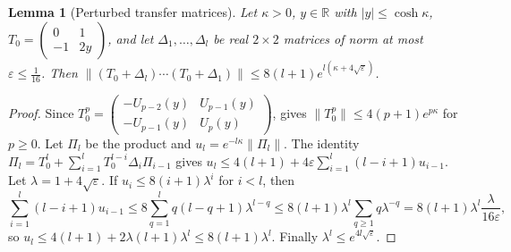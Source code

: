 \documentclass[11pt]{amsart}
\newtheorem{lemma}[theorem]{Lemma}
\theoremstyle{definition}
\theoremstyle{remark}
\numberwithin{equation}{section}
\newcommand{\R}{\mathbb{R}}
\newcommand{\eps}{\varepsilon}
\begin{document}
\begin{lemma}[Perturbed transfer matrices]\label{lem:perturbed}
Let $\kappa>0$, $y\in\R$ with $|y|\le\cosh\kappa$, $T_0=\begin{pmatrix}0&1\\-1&2y\end{pmatrix}$, and let $\Delta_1,\dots,\Delta_l$ be real $2\times2$ matrices of norm at most $\eps\le\frac1{16}$. Then $\|(T_0+\Delta_l)\cdots(T_0+\Delta_1)\|\le8(l+1)e^{l(\kappa+4\sqrt\eps)}$.
\end{lemma}

\begin{proof}
Since $T_0^p=\begin{pmatrix}-U_{p-2}(y)&U_{p-1}(y)\\-U_{p-1}(y)&U_p(y)\end{pmatrix}$, \cite[Lemma~\ref{M-lem:chebyshev}]{Main} gives $\|T_0^p\|\le4(p+1)e^{p\kappa}$ for $p\ge0$. Let $\Pi_l$ be the product and $u_l=e^{-l\kappa}\|\Pi_l\|$. The identity $\Pi_l=T_0^l+\sum_{i=1}^lT_0^{l-i}\Delta_i\Pi_{i-1}$ gives $u_l\le4(l+1)+4\eps\sum_{i=1}^l(l-i+1)u_{i-1}$. Let $\lambda=1+4\sqrt\eps$. If $u_i\le8(i+1)\lambda^i$ for $i<l$, then
\[
\sum_{i=1}^l(l-i+1)u_{i-1}\le8\sum_{q=1}^lq(l-q+1)\lambda^{l-q}\le8(l+1)\lambda^l\sum_{q\ge1}q\lambda^{-q}=8(l+1)\lambda^l\frac{\lambda}{16\eps},
\]
so $u_l\le4(l+1)+2\lambda(l+1)\lambda^l\le8(l+1)\lambda^l$. Finally $\lambda^l\le e^{4l\sqrt\eps}$.
\end{proof}
\end{document}
